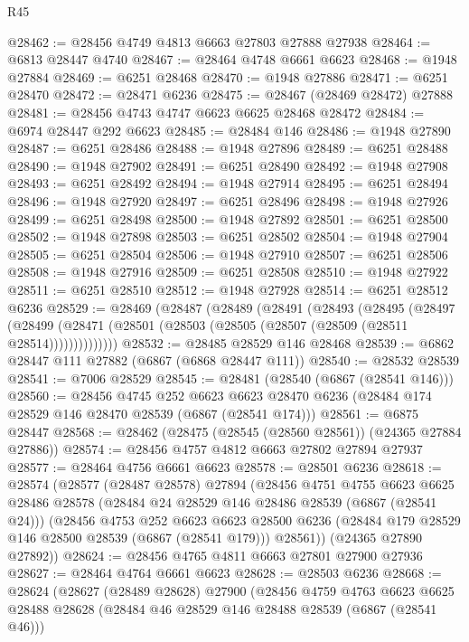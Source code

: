 \begin{lexlean}{R45}
\begin{coremodule}
{@28462 := @28456 @4749 @4813 @6663 @27803 @27888 @27938
@28464 := @6813 @28447 @4740
@28467 := @28464 @4748 @6661 @6623
@28468 := @1948 @27884
@28469 := @6251 @28468
@28470 := @1948 @27886
@28471 := @6251 @28470
@28472 := @28471 @6236
@28475 := @28467 (@28469 @28472) @27888
@28481 := @28456 @4743 @4747 @6623 @6625 @28468 @28472
@28484 := @6974 @28447 @292 @6623
@28485 := @28484 @146
@28486 := @1948 @27890
@28487 := @6251 @28486
@28488 := @1948 @27896
@28489 := @6251 @28488
@28490 := @1948 @27902
@28491 := @6251 @28490
@28492 := @1948 @27908
@28493 := @6251 @28492
@28494 := @1948 @27914
@28495 := @6251 @28494
@28496 := @1948 @27920
@28497 := @6251 @28496
@28498 := @1948 @27926
@28499 := @6251 @28498
@28500 := @1948 @27892
@28501 := @6251 @28500
@28502 := @1948 @27898
@28503 := @6251 @28502
@28504 := @1948 @27904
@28505 := @6251 @28504
@28506 := @1948 @27910
@28507 := @6251 @28506
@28508 := @1948 @27916
@28509 := @6251 @28508
@28510 := @1948 @27922
@28511 := @6251 @28510
@28512 := @1948 @27928
@28514 := @6251 @28512 @6236
@28529 := @28469
    (@28487
      (@28489
        (@28491
          (@28493
            (@28495
              (@28497
                (@28499 (@28471 (@28501 (@28503 (@28505 (@28507 (@28509 (@28511 @28514))))))))))))))
@28532 := @28485 @28529 @146 @28468
@28539 := @6862 @28447 @111 @27882 (@6867 (@6868 @28447 @111))
@28540 := @28532 @28539
@28541 := @7006 @28529
@28545 := @28481 (@28540 (@6867 (@28541 @146)))
@28560 := @28456
    @4745
    @252
    @6623
    @6623
    @28470
    @6236
    (@28484 @174 @28529 @146 @28470 @28539 (@6867 (@28541 @174)))
@28561 := @6875 @28447
@28568 := @28462 (@28475 (@28545 (@28560 @28561)) (@24365 @27884 @27886))
@28574 := @28456 @4757 @4812 @6663 @27802 @27894 @27937
@28577 := @28464 @4756 @6661 @6623
@28578 := @28501 @6236
@28618 := @28574
    (@28577
      (@28487 @28578)
      @27894
      (@28456
        @4751
        @4755
        @6623
        @6625
        @28486
        @28578
        (@28484 @24 @28529 @146 @28486 @28539 (@6867 (@28541 @24)))
        (@28456
          @4753
          @252
          @6623
          @6623
          @28500
          @6236
          (@28484 @179 @28529 @146 @28500 @28539 (@6867 (@28541 @179)))
          @28561))
      (@24365 @27890 @27892))
@28624 := @28456 @4765 @4811 @6663 @27801 @27900 @27936
@28627 := @28464 @4764 @6661 @6623
@28628 := @28503 @6236
@28668 := @28624
    (@28627
      (@28489 @28628)
      @27900
      (@28456
        @4759
        @4763
        @6623
        @6625
        @28488
        @28628
        (@28484 @46 @28529 @146 @28488 @28539 (@6867 (@28541 @46)))
}
\end{coremodule}
\end{lexlean}
